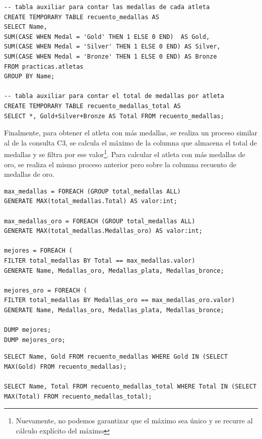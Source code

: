 \begin{lstlisting}[style=base,caption={C4, recuento de medallas en Hive}, label={hive_C4_med}]	
-- tabla auxiliar para contar las medallas de cada atleta
CREATE TEMPORARY TABLE recuento_medallas AS
SELECT Name,
SUM(CASE WHEN Medal = 'Gold' THEN 1 ELSE 0 END)  AS Gold,
SUM(CASE WHEN Medal = 'Silver' THEN 1 ELSE 0 END) AS Silver,
SUM(CASE WHEN Medal = 'Bronze' THEN 1 ELSE 0 END) AS Bronze
FROM practicas.atletas
GROUP BY Name;

-- tabla auxiliar para contar el total de medallas por atleta
CREATE TEMPORARY TABLE recuento_medallas_total AS
SELECT *, Gold+Silver+Bronze AS Total FROM recuento_medallas;
\end{lstlisting}
Finalmente, para obtener el atleta con más medallas, se realiza un proceso similar al de la consulta C3, se calcula el máximo de la columna que almacena el total de medallas y se filtra por ese valor\footnote{Nuevamente, no podemos garantizar que el máximo sea único y se recurre al cálculo explícito del máximo}. Para calcular el atleta con más medallas de oro, se realiza el mismo proceso anterior pero sobre la columna recuento de medallas de oro.
\begin{lstlisting}[style=base,caption={C4 filtro por el deportista con más medallas en total y de oro en Pig}, label={pig_C4_med}]	
max_medallas = FOREACH (GROUP total_medallas ALL)
GENERATE MAX(total_medallas.Total) AS valor:int;

max_medallas_oro = FOREACH (GROUP total_medallas ALL)
GENERATE MAX(total_medallas.Medallas_oro) AS valor:int;

mejores = FOREACH (
FILTER total_medallas BY Total == max_medallas.valor)
GENERATE Name, Medallas_oro, Medallas_plata, Medallas_bronce;

mejores_oro = FOREACH (
FILTER total_medallas BY Medallas_oro == max_medallas_oro.valor)
GENERATE Name, Medallas_oro, Medallas_plata, Medallas_bronce;

DUMP mejores;
DUMP mejores_oro;
\end{lstlisting}
\begin{lstlisting}[style=base,caption={C4 filtro por el deportista con más medallas en total y de oro en Hive}, label={hive_C4_med}]	
SELECT Name, Gold FROM recuento_medallas WHERE Gold IN (SELECT MAX(Gold) FROM recuento_medallas);

SELECT Name, Total FROM recuento_medallas_total WHERE Total IN (SELECT MAX(Total) FROM recuento_medallas_total);
\end{lstlisting}
